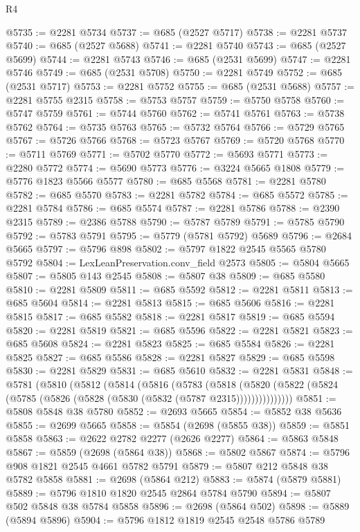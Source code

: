 \begin{lexlean}{R4}
\begin{coremodule}
@5735 := @2281 @5734
@5737 := @685 (@2527 @5717)
@5738 := @2281 @5737
@5740 := @685 (@2527 @5688)
@5741 := @2281 @5740
@5743 := @685 (@2527 @5699)
@5744 := @2281 @5743
@5746 := @685 (@2531 @5699)
@5747 := @2281 @5746
@5749 := @685 (@2531 @5708)
@5750 := @2281 @5749
@5752 := @685 (@2531 @5717)
@5753 := @2281 @5752
@5755 := @685 (@2531 @5688)
@5757 := @2281 @5755 @2315
@5758 := @5753 @5757
@5759 := @5750 @5758
@5760 := @5747 @5759
@5761 := @5744 @5760
@5762 := @5741 @5761
@5763 := @5738 @5762
@5764 := @5735 @5763
@5765 := @5732 @5764
@5766 := @5729 @5765
@5767 := @5726 @5766
@5768 := @5723 @5767
@5769 := @5720 @5768
@5770 := @5711 @5769
@5771 := @5702 @5770
@5772 := @5693 @5771
@5773 := @2280 @5772
@5774 := @5690 @5773
@5776 := @3224 @5665 @1808
@5779 := @5776 @1823 @5566 @5577
@5780 := @685 @5568
@5781 := @2281 @5780
@5782 := @685 @5570
@5783 := @2281 @5782
@5784 := @685 @5572
@5785 := @2281 @5784
@5786 := @685 @5574
@5787 := @2281 @5786
@5788 := @2390 @2315
@5789 := @2386 @5788
@5790 := @5787 @5789
@5791 := @5785 @5790
@5792 := @5783 @5791
@5795 := @5779 (@5781 @5792) @5689
@5796 := @2684 @5665
@5797 := @5796 @898
@5802 := @5797 @1822 @2545 @5565 @5780 @5792
@5804 := LexLeanPreservation.conv_field @2573
@5805 := @5804 @5665
@5807 := @5805 @143 @2545
@5808 := @5807 @38
@5809 := @685 @5580
@5810 := @2281 @5809
@5811 := @685 @5592
@5812 := @2281 @5811
@5813 := @685 @5604
@5814 := @2281 @5813
@5815 := @685 @5606
@5816 := @2281 @5815
@5817 := @685 @5582
@5818 := @2281 @5817
@5819 := @685 @5594
@5820 := @2281 @5819
@5821 := @685 @5596
@5822 := @2281 @5821
@5823 := @685 @5608
@5824 := @2281 @5823
@5825 := @685 @5584
@5826 := @2281 @5825
@5827 := @685 @5586
@5828 := @2281 @5827
@5829 := @685 @5598
@5830 := @2281 @5829
@5831 := @685 @5610
@5832 := @2281 @5831
@5848 := @5781
    (@5810
      (@5812
        (@5814
          (@5816
            (@5783
              (@5818
                (@5820 (@5822 (@5824 (@5785 (@5826 (@5828 (@5830 (@5832 (@5787 @2315)))))))))))))))
@5851 := @5808 @5848 @38 @5780
@5852 := @2693 @5665
@5854 := @5852 @38 @5636
@5855 := @2699 @5665
@5858 := @5854 (@2698 (@5855 @38))
@5859 := @5851 @5858
@5863 := @2622 @2782 @2277 (@2626 @2277)
@5864 := @5863 @5848
@5867 := @5859 (@2698 (@5864 @38))
@5868 := @5802 @5867
@5874 := @5796 @908 @1821 @2545 @4661 @5782 @5791
@5879 := @5807 @212 @5848 @38 @5782 @5858
@5881 := @2698 (@5864 @212)
@5883 := @5874 (@5879 @5881)
@5889 := @5796 @1810 @1820 @2545 @2864 @5784 @5790
@5894 := @5807 @502 @5848 @38 @5784 @5858
@5896 := @2698 (@5864 @502)
@5898 := @5889 (@5894 @5896)
@5904 := @5796 @1812 @1819 @2545 @2548 @5786 @5789

\end{coremodule}
\end{lexlean}

